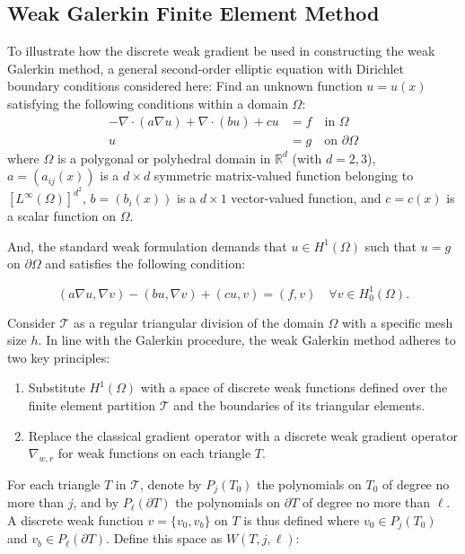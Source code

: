 \documentclass[12pt]{article} %
\begin{document}
\subsection{Weak Galerkin Finite Element Method}

To illustrate how the discrete weak gradient be used in constructing the weak Galerkin method,
a general second-order elliptic equation with Dirichlet boundary conditions considered here: Find an unknown function \( u = u(x) \) satisfying the following conditions within a domain \( \Omega \):
\begin{align}
    -\nabla \cdot (a \nabla u) + \nabla \cdot (bu) + cu &= f \quad \text{in } \Omega \\
    u &= g \quad \text{on } \partial \Omega
\end{align}
where \( \Omega \) is a polygonal or polyhedral domain in \( \mathbb{R}^d \) (with \( d = 2, 3 \)), \( a = (a_{ij}(x)) \) is a \( d \times d \) symmetric matrix-valued function belonging to \( [L^\infty(\Omega)]^{d^2} \), \( b = (b_i(x)) \) is a \( d \times 1 \) vector-valued function, and \( c = c(x) \) is a scalar function on \( \Omega \).

And, the standard weak formulation demands that \(u \in H^1(\Omega)\) such that \(u = g\) on \(\partial\Omega\) and satisfies the following condition:

\begin{equation}
    (a \nabla u, \nabla v) - (bu, \nabla v) + (cu, v) = (f, v) \quad \forall v \in H^1_0(\Omega).
\end{equation}

Consider \(\mathcal{T} \) as a regular triangular division of the domain \(\Omega\) with a specific mesh size \(h\). In line with the Galerkin procedure, the weak Galerkin method adheres to two key principles:
\begin{enumerate}
    \item Substitute \(H^1(\Omega)\) with a space of discrete weak functions defined over the finite element partition \(\mathcal{T}\) and the boundaries of its triangular elements.
    \item Replace the classical gradient operator with a discrete weak gradient operator \(\nabla_{w,r}\) for weak functions on each triangle \(T\).
\end{enumerate}

For each triangle \(T\) in \(\mathcal{T}\), denote by \(P_j(T_0)\) the polynomials on \(T_0\) of degree no more than \(j\), and by \(P_\ell(\partial T)\) the polynomials on \(\partial T\) of degree no more than \(\ell\). A discrete weak function \(v = \{v_0, v_b\}\) on \(T\) is thus defined where \(v_0 \in P_j(T_0)\) and \(v_b \in P_\ell(\partial T)\). Define this space as \(W(T, j, \ell)\):
\end{document}
